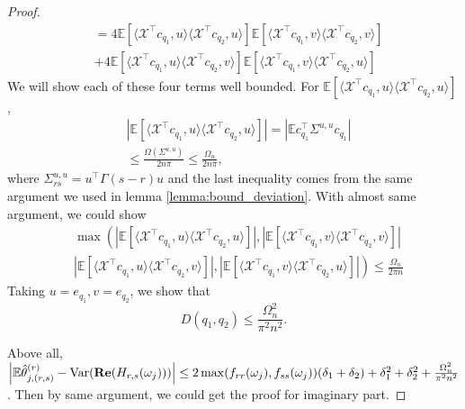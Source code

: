 \begin{proof}
\begin{equation}
\begin{aligned}
&= 4\mathbb{E} \left[ \langle \mathcal{X}^\top  c_{q_1}, u \rangle  \langle \mathcal{X}^\top  c_{q_2}, u \rangle \right] \mathbb{E} \left[ \langle \mathcal{X}^\top  c_{q_1}, v \rangle  \langle \mathcal{X}^\top  c_{q_2}, v \rangle \right]\\
&+4\mathbb{E} \left[ \langle \mathcal{X}^\top  c_{q_1}, u \rangle  \langle \mathcal{X}^\top  c_{q_2}, v \rangle \right]\mathbb{E} \left[ \langle \mathcal{X}^\top  c_{q_1}, v \rangle  \langle \mathcal{X}^\top  c_{q_2}, u \rangle \right]
\end{aligned}
\end{equation}
We will show each of these four terms well bounded. For $\mathbb{E} \left[ \langle \mathcal{X}^\top  c_{q_1}, u \rangle  \langle \mathcal{X}^\top  c_{q_2}, u \rangle \right]$, 
\begin{equation}
\begin{aligned}
&|\mathbb{E} \left[ \langle \mathcal{X}^\top  c_{q_1}, u \rangle  \langle \mathcal{X}^\top  c_{q_2}, u \rangle\right]| = |\mathbb{E} c_{q_1}^\top   \Sigma^{u, u} c_{q_1}| \\
& \le \frac{\Omega(\Sigma^{u, u})}{2n\pi} \le \frac{\Omega_n}{2n\pi},
\end{aligned}
\end{equation}
where $\Sigma^{u, u}_{rs} = u^\top   \Gamma(s-r)u$ and the last inequality comes from the same argument we used in lemma \ref{lemma:bound_deviation}.
With almost same argument, we could show 
\begin{equation}
\begin{aligned}
&\max\left(\left|\mathbb{E} \left[ \langle \mathcal{X}^\top  c_{q_1}, u \rangle  \langle \mathcal{X}^\top  c_{q_2}, u \rangle \right]\right|,  \left|\mathbb{E} \left[ \langle \mathcal{X}^\top  c_{q_1}, v \rangle  \langle \mathcal{X}^\top  c_{q_2}, v \rangle \right]\right|\right.\\
&\left. \left|\mathbb{E} \left[ \langle \mathcal{X}^\top  c_{q_1}, u \rangle  \langle \mathcal{X}^\top  c_{q_2}, v \rangle \right]\right|, \left|\mathbb{E} \left[ \langle \mathcal{X}^\top  c_{q_1}, v \rangle  \langle \mathcal{X}^\top  c_{q_2}, u \rangle \right]\right|\right) \le \frac{\Omega_n}{2\pi n}
\end{aligned}
\end{equation}
Taking $u= e_{q_1}, v= e_{q_2}$, we show that 
\begin{equation}
D(q_1,q_2) \le \frac{\Omega_n^2}{\pi^2n^2}. 
\end{equation}

Above all, $\left |\mathbb{E} \hat{\theta}^{(r)}_{j,(r,s)}-\mbox{Var}({\bf Re}(H_{r,s}(\omega_j)))\right| \le 2\max(f_{rr}(\omega_j),f_{ss}(\omega_j))(\delta_1+\delta_2)+\delta_1^2+\delta_2^2+\frac{\Omega_n^2}{\pi^2n^2}$. Then by same argument, we could get the proof for imaginary part. 
\end{proof}

